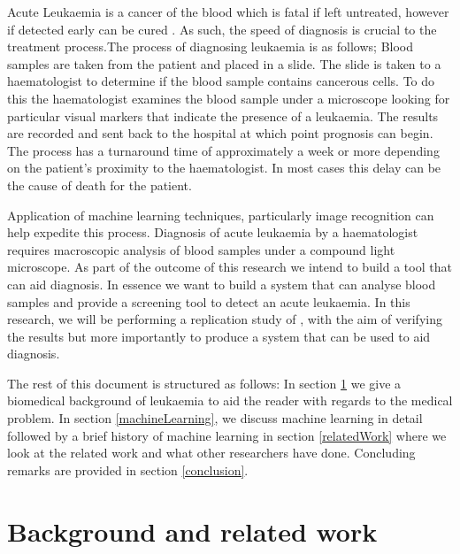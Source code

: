 \documentclass[a4paper,11pt]{article}
\begin{document}
Acute Leukaemia is a cancer of the blood which is fatal if left untreated, however if detected early can be cured \citep{Greaves}. As such, the speed of diagnosis is crucial to the treatment process.The process of diagnosing leukaemia is as follows; Blood samples are taken from the patient and placed in a slide. The slide is taken to a haematologist to determine if the blood sample contains cancerous cells. To do this the haematologist examines the blood sample under a microscope looking for particular visual markers that indicate the presence of a leukaemia. The results are recorded and sent back to the hospital at which point prognosis can begin. The process has a turnaround time of approximately a week or more depending on the patient's proximity to the haematologist. In most cases this delay can be the cause of death for the patient.

Application of machine learning techniques, particularly image recognition can help expedite this process. Diagnosis of acute leukaemia by a haematologist requires macroscopic analysis of blood samples under a compound light microscope. As part of the outcome of this research we intend to build a tool that can aid diagnosis. In essence we want to build a system that can analyse blood samples and provide a screening tool to detect an acute leukaemia. In
this research, we will be performing a replication study of \cite{Sara}, with the aim of verifying the results but more importantly to produce a system that can be used to aid diagnosis.

The rest of this document is structured as follows: In section \ref{background} we give a biomedical background of leukaemia to aid the reader with regards to the medical problem. In section \ref{machineLearning}, we discuss machine learning in detail followed by a brief history of machine learning in section \ref{relatedWork} where we look at the related work and what other researchers have done. Concluding remarks are provided in section \ref{conclusion}.
\section{Background and related work}
\label{background}
\end{document}
